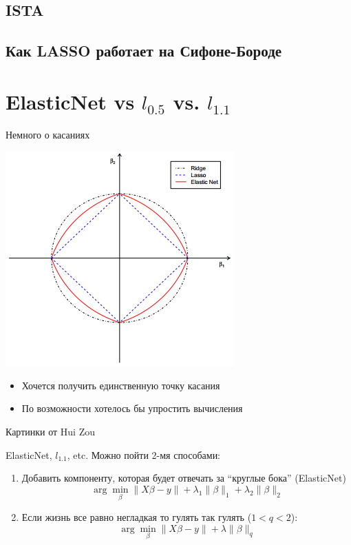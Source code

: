 \documentclass[14pt, fleqn, xcolor={dvipsnames, table}]{beamer}
\begin{document}
\subsection{ISTA}
\subsection{Как LASSO работает на Сифоне-Бороде}

\section{ElasticNet vs $l_{0.5}$ vs. $l_{1.1}$}
\begin{frame}{Немного о касаниях}
\begin{center}
\includegraphics[height=0.9\textheight]{ElasticNet.png} 
\end{center}
\footnotesize
\begin{itemize}
  \item Хочется получить единственную точку касания
  \item По возможности хотелось бы упростить вычисления
\end{itemize}
Картинки от Hui Zou
\end{frame}

\begin{frame}{ElasticNet, $l_1.1$, etc.}
Можно пойти 2-мя способами:
\begin{enumerate}
  \item Добавить компоненту, которая будет отвечать за ``круглые бока'' (ElasticNet)
  $$
    \arg \min_\beta \|X\beta - y \| + \lambda_1 \|\beta\|_1 + \lambda_2 \|\beta\|_2
  $$
  \item Если жизнь все равно негладкая то гулять так гулять ($1 < q < 2$):
  $$
    \arg \min_\beta \|X\beta - y \| + \lambda \|\beta\|_q
  $$
\end{enumerate}
\end{frame}
\end{document}
